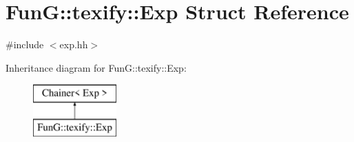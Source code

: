 \hypertarget{structFunG_1_1texify_1_1Exp}{\section{Fun\-G\-:\-:texify\-:\-:Exp Struct Reference}
\label{structFunG_1_1texify_1_1Exp}
}


{\ttfamily \#include $<$exp.\-hh$>$}

Inheritance diagram for Fun\-G\-:\-:texify\-:\-:Exp\-:\begin{figure}[H]
\begin{center}
\leavevmode
\includegraphics[height=2.000000cm]{structFunG_1_1texify_1_1Exp}
\end{center}
\end{figure}

